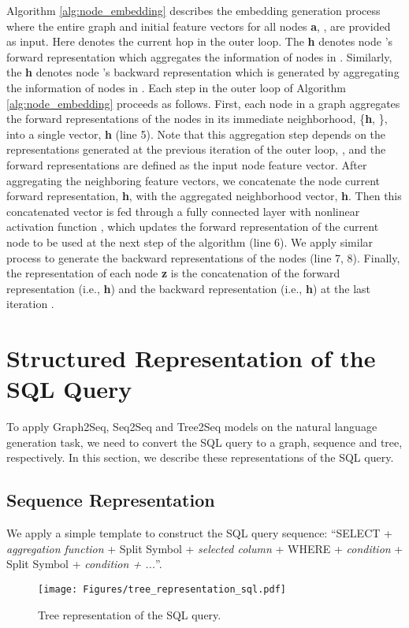 \documentclass{article} \usepackage{iclr2019_conference,times}
\begin{document}
Algorithm \ref{alg:node_embedding} describes the embedding generation process where the entire graph 
and initial feature vectors for all nodes \textbf{a}, , are provided as input.
Here  denotes the current hop in the outer loop. The \textbf{h} denotes node 's forward representation
which aggregates the information of nodes in .
Similarly, the \textbf{h} denotes node 's backward representation which is generated by
aggregating the information of nodes in .
Each step in the outer loop of Algorithm \ref{alg:node_embedding} proceeds as follows.
First, each node  in a graph aggregates the forward representations of the nodes in its immediate neighborhood,
\{\textbf{h}, \}, into a single vector, \textbf{h} (line 5).
Note that this aggregation step depends on the representations generated at the previous iteration of the
outer loop, , and the  forward representations are defined as the input node feature vector.
After aggregating the neighboring feature vectors, we concatenate the node current forward representation, \textbf{h}, with the aggregated neighborhood vector, \textbf{h}. Then this concatenated vector is fed through a fully connected layer with nonlinear activation function ,
which updates the forward representation of the current node to be used at the next step of the algorithm (line 6).
We apply similar process to generate the backward representations of the nodes (line 7, 8).
Finally, the representation of each node \textbf{z} is the concatenation of the forward
representation (i.e., \textbf{h}) and the backward representation (i.e., \textbf{h}) at the last iteration .

\section{Structured Representation of the SQL Query}
To apply Graph2Seq, Seq2Seq and Tree2Seq models on the natural language generation task, we need to convert the SQL query to a graph, sequence and tree, respectively.
In this section, we describe these representations of the SQL query.

\subsection{Sequence Representation}
We apply a simple template to construct the SQL query sequence: ``SELECT + \textit{aggregation function} + Split Symbol + \textit{selected column} + WHERE + \textit{condition} + Split Symbol + \textit{condition + ...}''.

\begin{figure}[h]
\centering\texttt{[image: Figures/tree\_representation\_sql.pdf]}
\caption{Tree representation of the SQL query.}
\label{fig:tree_rep}
\vspace{-0.5cm}
\end{figure}
\end{document}
